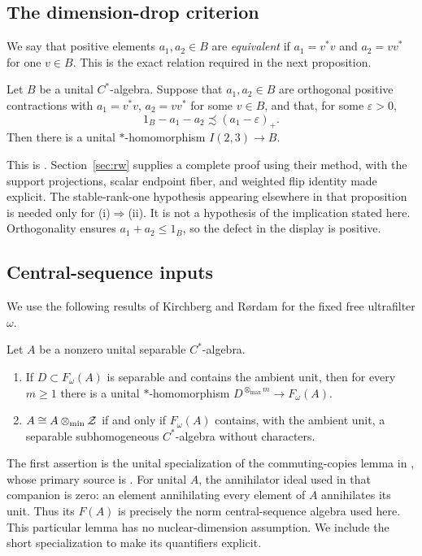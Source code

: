 \subsection{The dimension-drop criterion}
We say that positive elements $a_1,a_2\in B$ are \emph{equivalent} if
$a_1=v^*v$ and $a_2=vv^*$ for one $v\in B$. This is the exact relation
required in the next proposition.

\begin{proposition}\label{prop:rw}
Let $B$ be a unital $C^*$-algebra. Suppose that $a_1,a_2\in B$ are
orthogonal positive contractions with $a_1=v^*v$, $a_2=vv^*$ for some
$v\in B$, and that, for some $\varepsilon>0$,
\[
 1_B-a_1-a_2\precsim(a_1-\varepsilon)_+.
\]
Then there is a unital $*$-homomorphism $I(2,3)\to B$.
\end{proposition}

This is \cite[Proposition~5.1, (ii)$\Rightarrow$(iv), with $n=2$]{RW}.
Section~\ref{sec:rw} supplies a complete proof using their method, with
the support projections, scalar endpoint fiber, and weighted flip
identity made explicit.
The stable-rank-one hypothesis appearing elsewhere in that proposition is
needed only for (i)$\Rightarrow$(ii). It is not a hypothesis of the
implication stated here. Orthogonality ensures $a_1+a_2\le1_B$, so the
defect in the display is positive.

\subsection{Central-sequence inputs}
We use the following results of Kirchberg and R\o rdam for the fixed free
ultrafilter $\omega$.

\begin{proposition}\label{prop:kr}
Let $A$ be a nonzero unital separable $C^*$-algebra.
\begin{enumerate}
\item If $D\subset F_\omega(A)$ is separable and contains the ambient
unit, then for every $m\ge1$ there is a unital $*$-homomorphism
$D^{\otimes_{\max}m}\to F_\omega(A)$.
\item $A\cong A\otimes_{\min}\mathcal Z$ if and only if $F_\omega(A)$ contains, with
the ambient unit, a separable subhomogeneous $C^*$-algebra without
characters.
\end{enumerate}
\end{proposition}

The first assertion is the unital specialization of the commuting-copies
lemma in \cite[Lemma~9.3]{Fixed231}, whose primary source is
\cite[Proposition~2.2 and Corollary~2.3]{KR}. For unital $A$, the
annihilator ideal used in that companion is zero: an element annihilating
every element of $A$ annihilates its unit. Thus its $F(A)$ is precisely
the norm central-sequence algebra used here. This particular lemma has
no nuclear-dimension assumption. We include the short specialization
to make its quantifiers explicit.

